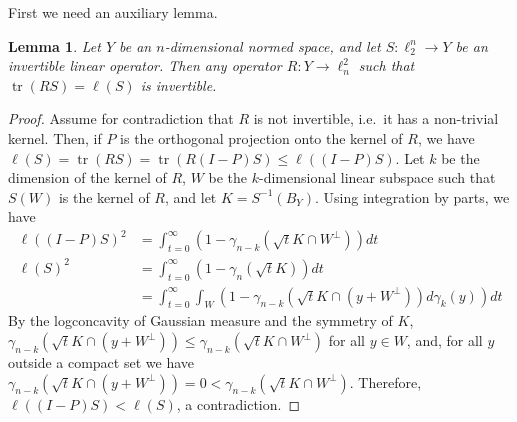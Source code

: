 \documentclass[12pt]{article}
\newtheorem{lemma}{Lemma}
\DeclareMathOperator{\tr}{tr}
\begin{document}
First we need an auxiliary lemma. 

\begin{lemma}\label{lm:invertible}
  Let $Y$ be an $n$-dimensional normed space, and let $S:\ell_2^n \to
  Y$ be an invertible linear operator. Then any operator $R:Y \to
  \ell^2_n$ such that $\tr(RS) = \ell(S)$ is invertible.
\end{lemma}
\begin{proof}
  Assume for contradiction that $R$ is not invertible, i.e.~it has a
  non-trivial kernel. Then, if $P$ is the orthogonal projection onto
  the kernel of $R$, we have $\ell(S) = \tr(RS) = \tr(R(I-P)S) \le
  \ell((I-P)S)$. Let $k$ be the dimension of the kernel of $R$, $W$ be
  the $k$-dimensional linear subspace such that $S(W)$ is the kernel
  of $R$, and let $K = S^{-1}(B_Y)$. Using integration by parts,
  we have
  \begin{align*}
  \ell((I-P)S)^2 &= \int_{t = 0}^\infty (1-\gamma_{n-k}(\sqrt{t}K\cap W^\perp))dt\\
  \ell(S)^2 &= \int_{t = 0}^\infty (1-\gamma_n(\sqrt{t}K))dt\\
  &= \int_{t = 0}^\infty \int_{W}(1-\gamma_{n-k}(\sqrt{t}K \cap (y + W^\perp))d\gamma_{k}(y))dt
  \end{align*}
  By the logconcavity of Gaussian measure and the symmetry of $K$,
  $\gamma_{n-k}(\sqrt{t}K \cap (y + W^\perp)) \le \gamma_{n-k}(\sqrt{t}K \cap
  W^\perp)$ for all $y \in W$, and, for all $y$ outside a
  compact set we have $\gamma_{n-k}(\sqrt{t}K \cap (y + W^\perp)) = 0 <
  \gamma_{n-k}(\sqrt{t}K \cap W^\perp)$. Therefore, $\ell((I-P)S) < \ell(S)$, a
  contradiction.
\end{proof}
\end{document}

